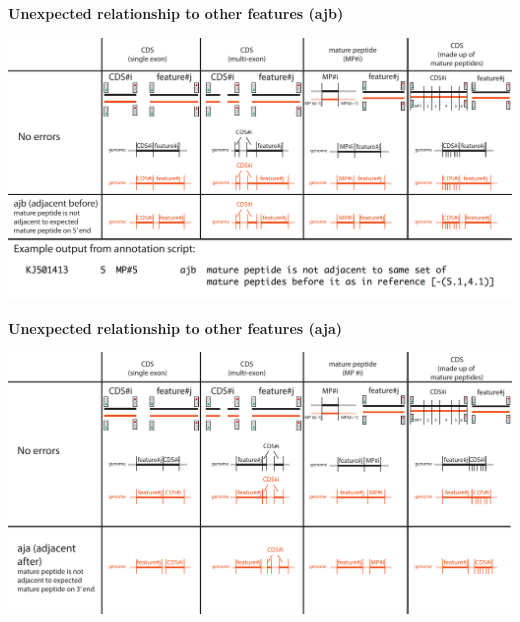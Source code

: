 \documentclass[landscape]{slides}
\begin{document}
\begin{slide}
\begin{center}
\textbf{Unexpected relationship to other features (ajb)}
\vspace{0.5in}

\includegraphics[width=10in]{figs/errornew-4-ajb}
\end{center}
\vfill
\end{slide}
\begin{slide}
\begin{center}
\textbf{Unexpected relationship to other features (aja)}
\vspace{0.5in}

\includegraphics[width=10in]{figs/error-7-aja}
\end{center}
\vfill
\end{slide}
\end{document}
